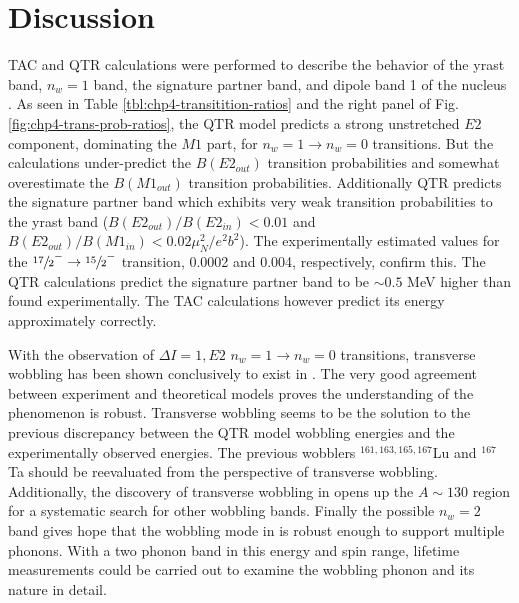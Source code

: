 \section{Discussion}
\label{sec:trw-discussion}
TAC and QTR calculations were performed to describe the behavior of the yrast band, $n_w=1$ band, the signature partner band, and dipole band 1 of the nucleus \pr{}. As seen in Table \ref{tbl:chp4-transitition-ratios} and the right panel of Fig. \ref{fig:chp4-trans-prob-ratios}, the QTR model predicts a strong unstretched $E2$ component, dominating the $M1$ part, for $n_w=1\rightarrow{}n_w=0$ transitions. But the calculations under-predict the $B(E2_{out})$ transition probabilities and somewhat overestimate the $B(M1_{out})$ transition probabilities. Additionally QTR predicts the signature partner band which exhibits very weak transition probabilities to the yrast band ($B(E2_{out})/B(E2_{in})<0.01$ and $B(E2_{out})/B(M1_{in})<0.02\mu^2_N/e^2b^2$). The experimentally estimated values for the $\sfrac{17}{2}^-\rightarrow\sfrac{15}{2}^-$ transition, 0.0002 and 0.004, respectively, confirm this. The QTR calculations predict the signature partner band to be $\sim{}0.5$ MeV higher than found experimentally. The TAC calculations however predict its energy approximately correctly.

With the observation of $\Delta{}I=1, E2$ $n_w=1\rightarrow{}n_w=0$ transitions, transverse wobbling has been shown conclusively to exist in \pr{}. The very good agreement between experiment and theoretical models proves the understanding of the phenomenon is robust. Transverse wobbling seems to be the solution to the previous discrepancy between the QTR model wobbling energies \cite{oldQTRWobblingTheory1,oldQTRWobblingTheory2,oldQTRWobblingTheory3,oldQTRWobblingTheory4} and the experimentally observed energies. The previous wobblers $^{161,163,165,167}$Lu \cite{wobblingIn163Lu,wobblingIn163LuTwoPhonon,wobblingIn165Lu,wobblingIn167Lu,wobblingIn161Lu} and $^{167}$Ta \cite{wobblingIn167Ta} should be reevaluated from the perspective of transverse wobbling. Additionally, the discovery of transverse wobbling in \pr{} opens up the $A\sim{}130$ region for a systematic search for other wobbling bands. Finally the possible $n_w=2$ band gives hope that the wobbling mode in \pr{} is robust enough to support multiple phonons. With a two phonon band in this energy and spin range, lifetime measurements could be carried out to examine the wobbling phonon and its nature in detail.

